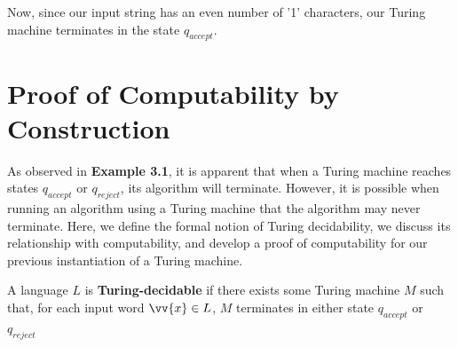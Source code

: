 \documentclass{article}
\begin{document}
\noindent Now, since our input string has an even number of '1' characters, our Turing machine terminates in the state $q_{accept}$. \cite{1}

\section{Proof of Computability by Construction}
As observed in \textbf{Example 3.1}, it is apparent that when a Turing machine reaches states $q_{accept}$ or $q_{reject}$, its algorithm will terminate.  However, it is possible when running an algorithm using a Turing machine that the algorithm may never terminate. Here, we define the formal notion of Turing decidability, we discuss its relationship with computability, and develop a proof of computability for our previous instantiation of a Turing machine.

\begin{defin}
	A language $L$ is \textbf{Turing-decidable} if there exists some Turing machine $M$ such that, for each input word $\vv{x} \in L$, $M$ terminates in either state $q_{accept}$ or $q_{reject}$ \cite{1}
\end{defin}
\end{document}
